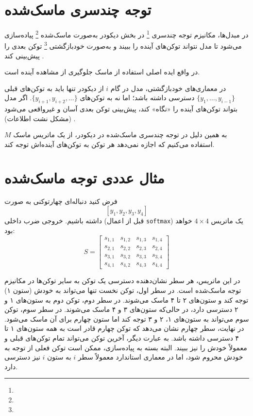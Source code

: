 \section{توجه چندسری ماسک‌شده}
در مبدل‌ها، مکانیزم توجه چندسری \footnote{} در بخش دیکودر به‌صورت ماسک‌شده \footnote{} پیاده‌سازی می‌شود تا مدل نتواند توکن‌های آینده را ببیند و به‌صورت خودبازگشتی \footnote{} توکن بعدی را پیش‌بینی کند \cite{vaswani2017attention}.

در واقع ایده اصلی استفاده از ماسک جلوگیری از مشاهده آینده است.

در معماری‌های خودبازگشتی، مدل در گام \( i \) از دیکودر تنها باید به توکن‌های قبلی \( \{ y_1, \dots, y_{i-1} \} \) دسترسی داشته باشد؛ اما نه به توکن‌های \( \{ y_{i+1}, y_{i+2}, \dots \} \). اگر مدل بتواند توکن‌های آینده را «نگاه» کند، پیش‌بینی توکن بعدی آسان و غیرواقعی می‌شود (مشکل نشت اطلاعات) \cite{bahdanau2014neural,sutskever2014sequence}.

به همین دلیل در توجه چندسری ماسک‌شده در دیکودر، از یک ماتریس ماسک \( M \) استفاده می‌کنیم که اجازه نمی‌دهد هر توکن به توکن‌های آینده‌اش توجه کند.

\section{مثال عددی توجه ماسک‌شده}
فرض کنید دنباله‌ای چهارتوکنی به صورت
\[
[y_1, y_2, y_3, y_4]
\]
داشته باشیم. خروجی ضرب داخلی (قبل از اعمال \texttt{softmax}) یک ماتریس \(4 \times 4\) خواهد بود:
\[
S =
\begin{bmatrix}
	s_{1,1} & s_{1,2} & s_{1,3} & s_{1,4} \\
	s_{2,1} & s_{2,2} & s_{2,3} & s_{2,4} \\
	s_{3,1} & s_{3,2} & s_{3,3} & s_{3,4} \\
	s_{4,1} & s_{4,2} & s_{4,3} & s_{4,4}
\end{bmatrix}
\]

در این ماتریس، هر سطر نشان‌دهنده دسترسی یک توکن به سایر توکن‌ها در مکانیزم توجه ماسک‌شده است. در سطر اول، توکن نخست تنها می‌تواند به خودش (ستون ۱) توجه کند و ستون‌های ۲ تا ۴ ماسک می‌شوند. در سطر دوم، توکن دوم به ستون‌های ۱ و ۲ دسترسی دارد، در حالی‌که ستون‌های ۳ و ۴ ماسک می‌شوند. در سطر سوم، توکن سوم می‌تواند به ستون‌های ۱، ۲ و ۳ توجه کند اما ستون چهارم برای آن ماسک می‌شود. در نهایت، سطر چهارم نشان می‌دهد که توکن چهارم قادر است به همه ستون‌های ۱ تا ۴ دسترسی داشته باشد. به عبارت دیگر، آخرین توکن می‌تواند تمام توکن‌های قبلی و معمولاً خودش را نیز ببیند. البته بسته به پیاده‌سازی، ممکن است توکن فعلی از توجه به خودش محروم شود، اما در معماری استاندارد معمولاً سطر \( i \) به ستون \( i \) نیز دسترسی دارد.


